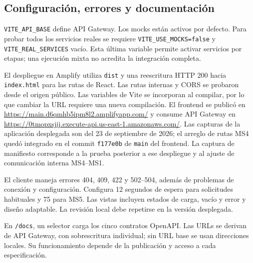 \subsection{Configuración, errores y documentación}
\texttt{VITE\_API\_BASE} define API Gateway. Los mocks están activos por defecto.
Para probar todos los servicios reales se requiere
\texttt{VITE\_USE\_MOCKS=false} y \texttt{VITE\_REAL\_SERVICES} vacío.
Esta última variable permite activar servicios por etapas; una ejecución mixta
no acredita la integración completa.

El despliegue en Amplify utiliza \texttt{dist} y una reescritura HTTP 200 hacia
\texttt{index.html} para las rutas de React. Las rutas internas y CORS se probaron
desde el origen público.
Las variables de Vite se incorporan al compilar, por lo que cambiar la URL
requiere una nueva compilación.
El frontend se publicó en
\url{https://main.d6qmhb5ipm8l2.amplifyapp.com/} y consume API Gateway en
\url{https://0tmopxsjij.execute-api.us-east-1.amazonaws.com/}.
Las capturas de la aplicación desplegada son del 23 de septiembre de 2026;
el arreglo de rutas MS4 quedó integrado en el commit \texttt{f177e0b} de
\texttt{main} del frontend. La captura de manifiesto corresponde a la prueba
posterior a ese despliegue y al ajuste de comunicación interna MS4--MS1.

El cliente maneja errores 404, 409, 422 y 502--504, además de problemas de conexión
y configuración. Configura 12 segundos de espera para solicitudes habituales
y 75 para MS5. Las vistas incluyen estados de carga, vacío y error y diseño
adaptable. La revisión local debe repetirse en la versión desplegada.

En \texttt{/docs}, un selector carga los cinco contratos OpenAPI. Las URLs
se derivan de API Gateway, con sobrescritura individual; sin URL base se usan
direcciones locales. Su funcionamiento depende de la publicación y acceso
a cada especificación.

